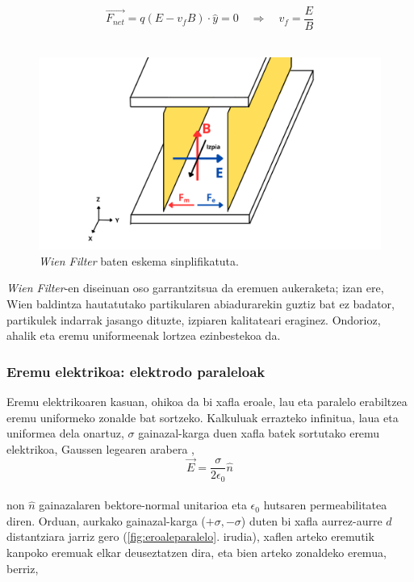 \documentclass[12pt]{article}
\numberwithin{figure}{section}
\numberwithin{equation}{section}
\begin{document}
\begin{equation}
    \vec{F_{net}}=q(E-v_fB)\cdot {\hat{y}}=0 \quad \Longrightarrow \quad \boxed{v_f = \frac{E}{B}}
    \label{eq:wienproperty}
\end{equation}\\
\begin{figure}[h]
    \centering
    \includegraphics[width=0.9\linewidth]{2 - Oinarri teorikoa/wienfilter_eskema.png}
    \caption{\textit{Wien Filter} baten eskema sinplifikatuta.}
    \label{fig:enter-wieneskema}
\end{figure}

\textit{Wien Filter}-en diseinuan oso garrantzitsua da eremuen aukeraketa; izan ere, Wien baldintza hautatutako partikularen abiadurarekin guztiz bat ez badator, partikulek indarrak jasango dituzte, izpiaren kalitateari eraginez. Ondorioz, ahalik eta eremu uniformeenak lortzea ezinbestekoa da.

\subsubsection{Eremu elektrikoa: elektrodo paraleloak}
\label{sec:elektrodo_paraleloak}

Eremu elektrikoaren kasuan, ohikoa da bi xafla eroale, lau eta paralelo erabiltzea eremu uniformeko zonalde bat sortzeko. Kalkuluak errazteko infinitua, laua eta uniformea dela onartuz, $\sigma$ gainazal-karga duen xafla batek sortutako eremu elektrikoa, Gaussen legearen arabera \cite{griffiths_introduction_1999},\\

\begin{equation}
\vec{E}=\frac{\sigma}{2\epsilon_0}\hat{n}
\end{equation}
\\
non $\hat{n}$ gainazalaren bektore-normal unitarioa eta $\epsilon_0$ hutsaren permeabilitatea diren. Orduan, aurkako gainazal-karga ($+\sigma , -\sigma$) duten bi xafla aurrez-aurre $d$ distantziara jarriz gero (\ref{fig:eroaleparalelo}. irudia), xaflen arteko eremutik kanpoko eremuak elkar deuseztatzen dira, eta bien arteko zonaldeko eremua, berriz,
\end{document}
